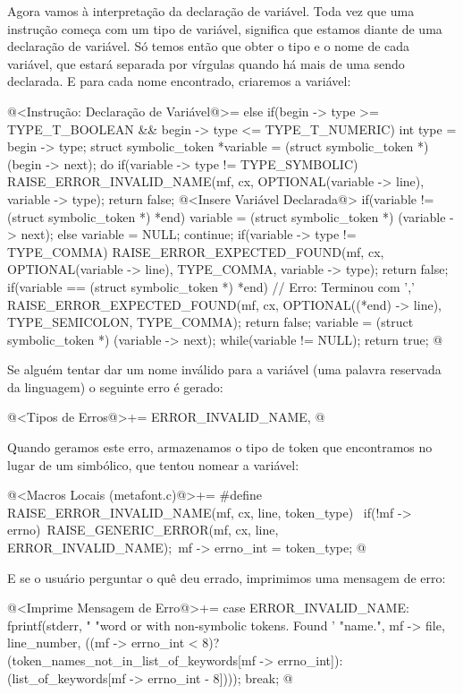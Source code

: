 Agora vamos à interpretação da declaração de variável. Toda vez que
uma instrução começa com um tipo de variável, significa que estamos
diante de uma declaração de variável. Só temos então que obter o tipo
e o nome de cada variável, que estará separada por vírgulas quando há
mais de uma sendo declarada. E para cada nome encontrado, criaremos a
variável:

\iniciocodigo
@<Instrução: Declaração de Variável@>=
else if(begin -> type >= TYPE_T_BOOLEAN && begin -> type <= TYPE_T_NUMERIC){
  int type = begin -> type;
  struct symbolic_token *variable = (struct symbolic_token *) (begin -> next);
  do{
    if(variable -> type != TYPE_SYMBOLIC){
      RAISE_ERROR_INVALID_NAME(mf, cx, OPTIONAL(variable -> line),
                              variable -> type);
      return false;
    }
    @<Insere Variável Declarada@>
    if(variable != (struct symbolic_token *) *end)
      variable = (struct symbolic_token *) (variable -> next);
    else{
      variable = NULL;
      continue;
    }
    if(variable -> type != TYPE_COMMA){
      RAISE_ERROR_EXPECTED_FOUND(mf, cx, OPTIONAL(variable -> line),
                                 TYPE_COMMA, variable -> type);
      return false;
    }
    if(variable == (struct symbolic_token *) *end){ // Erro: Terminou com ','
      RAISE_ERROR_EXPECTED_FOUND(mf, cx, OPTIONAL((*end) -> line),
                                TYPE_SEMICOLON, TYPE_COMMA);
      return false;
    }
    variable = (struct symbolic_token *) (variable -> next);
  } while(variable != NULL);
  return true;
}
@
\fimcodigo

Se alguém tentar dar um nome inválido para a variável (uma palavra
reservada da linguagem) o seguinte erro é gerado:

\iniciocodigo
@<Tipos de Erros@>+=
ERROR_INVALID_NAME,
@
\fimcodigo

Quando geramos este erro, armazenamos o tipo de token que encontramos
no lugar de um simbólico, que tentou nomear a variável:

\iniciocodigo
@<Macros Locais (metafont.c)@>+=
#define RAISE_ERROR_INVALID_NAME(mf, cx, line, token_type) {\
  if(!mf -> errno){\
    RAISE_GENERIC_ERROR(mf, cx, line, ERROR_INVALID_NAME);\
    mf -> errno_int = token_type;}}
@
\fimcodigo

E se o usuário perguntar o quê deu errado, imprimimos uma mensagem de erro:

\iniciocodigo
@<Imprime Mensagem de Erro@>+=
case ERROR_INVALID_NAME:
  fprintf(stderr, "%
          "word or with non-symbolic tokens. Found '%
          "name.", mf -> file, line_number,
          ((mf -> errno_int < 8)?
          (token_names_not_in_list_of_keywords[mf -> errno_int]):
          (list_of_keywords[mf -> errno_int - 8])));
  break;
@
\fimcodigo



